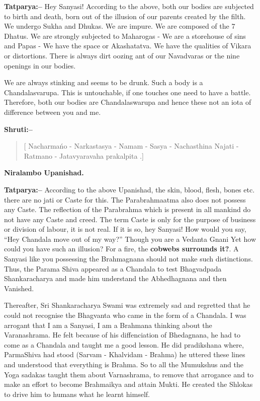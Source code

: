 \textbf{Tatparya:–} Hey Sanyasi! According to the above, both our bodies are subjected to birth and death, born out of the illusion of our parents created by the filth. We undergo Sukha and Dhukas. We are impure. We are composed of the 7 Dhatus. We are strongly subjected to Maharogas - We are a storehouse of sins and Papas - We have the space or Akashatatva. We have the qualities of Vikara or distortions. There is always dirt oozing ant of our Navadvaras or the nine openings in our bodies.

We are always stinking and seems to be drunk. Such a body is a Chandalasvarupa. This is untouchable, if one touches one need to have a battle. Therefore, both our bodies are Chandalaswarupa and hence these not an iota of difference between you and me.

\newpage

\textbf{Shruti:–}

\begin{verse}
[ Nacharmańo - Narkastasya - Namam - Sasya - Nacha\break sthina  Najati - Ratmano - Jatavyaravaha praka\break lpita .]
\end{verse}

\begin{flushright}
\textbf{Niralambo Upanishad.}
\end{flushright}

\textbf{Tatparya:–} According to the above Upanishad, the skin, blood, flesh, bones etc. there are no jati or Caste for this. The Parabrahmaatma also does not possess any Caste. The reflection of the Parabrahma which is present in all mankind do not have any Caste and creed. The term Caste is only for the purpose of business or division of labour, it is not real. If it is so, hey Sanyasi! How would you say, “Hey Chandala move out of my way?” Though you are a Vedanta Gnani Yet how could you have such an illusion? For a fire, the \textbf{cobwebs surrounds it?}. A Sanyasi like you possessing the Brahmagnana should not make such distinctions. Thus, the Parama Shiva appeared as a Chandala to test Bhagvadpada Shankaracharya and made him understand the Abhedhagnana and then Vanished.

Thereafter, Sri Shankaracharya Swami was extremely sad and regretted that he could not recognise the Bhagvanta who came in the form of a Chandala. I was arrogant that I am a Sanyasi, I am a Brahmana thinking about the Varanashrama. He felt because of his diffenciation of Bhedagnana, he had to come as a Chandala and taught me a good lesson. He did pradikshana where, ParmaShiva had stood (Sarvam - Khalvidam - Brahma) he uttered these lines and understood that everything is Brahma. So to all the Mumukshus and the Yoga sadakas taught them about Varnashrama, to remove that arrogance and to make an effort to become Brahmaikya and attain Mukti. He created the Shlokas to drive him to humans what he learnt himself.

